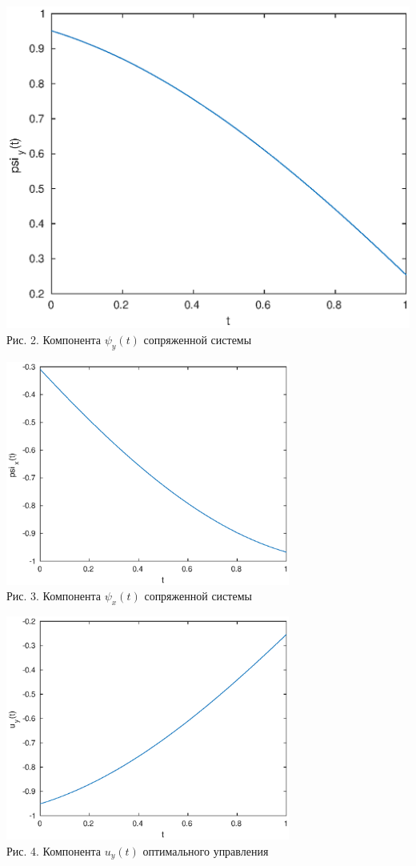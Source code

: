 \documentclass[11pt]{article}
\begin{document}
	\begin{center}	
		\includegraphics[width= 0.7	\textwidth ]{pic_2.eps}\\		
		{Рис. 2. Компонента $\psi_y(t)$ сопряженной системы}
	\end{center}
	
	\newpage
	
	\begin{center}
		\includegraphics[width=0.7\textwidth]{pic_3.eps}\\
		{Рис. 3. Компонента $\psi_x(t)$ сопряженной системы}
	\end{center}
	\begin{center}	
		\includegraphics[width= 0.7\textwidth ]{pic_4.eps}\\		
		{Рис. 4. Компонента $u_y(t)$ оптимального управления}
	\end{center}
\end{document}
